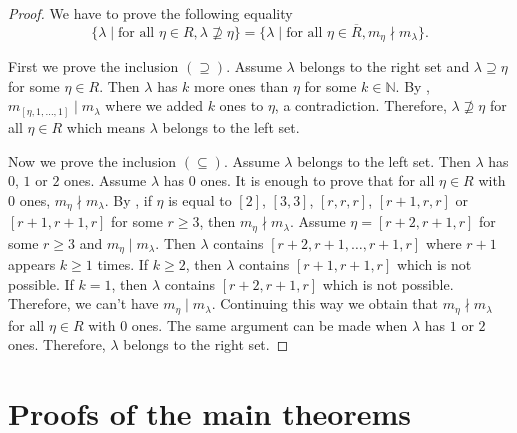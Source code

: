 \documentclass[a4paper, 12pt, reqno]{amsart}
\theoremstyle{remark}
\begin{document}
\begin{proof}
  We have to prove the following equality
  \begin{equation*}
    \{\lambda \mid \text{for all }\eta \in R, \lambda \nsupseteq \eta\} = \{\lambda \mid \text{for all } \eta \in \overline{R}, m_\eta \nmid m_\lambda\}.
  \end{equation*}
  
  First we prove the inclusion $(\supseteq)$.
  Assume $\lambda$ belongs to the right set and $\lambda \supseteq \eta$ for some $\eta \in R$.
  Then $\lambda$ has $k$ more ones than $\eta$ for some $k \in \mathbb{N}$.
  By , $m_{[\eta, 1, \dots, 1]} \mid m_\lambda$ where we added $k$ ones to $\eta$, a contradiction.
  Therefore, $\lambda \nsupseteq \eta$ for all $\eta \in R$ which means $\lambda$ belongs to the left set.

  Now we prove the inclusion $(\subseteq)$.
  Assume $\lambda$ belongs to the left set.
  Then $\lambda$ has $0$, $1$ or $2$ ones.
  Assume $\lambda$ has $0$ ones.
  It is enough to prove that for all $\eta \in R$ with $0$ ones, $m_\eta \nmid m_\lambda$.
  By , if $\eta$ is equal to $[2]$, $[3, 3]$, $[r, r, r]$, $[r + 1, r, r]$ or $[r + 1, r + 1, r]$ for some $r \ge 3$, then $m_\eta \nmid m_\lambda$.
  Assume $\eta = [r + 2, r + 1, r]$ for some $r \ge 3$ and $m_\eta \mid m_\lambda$.
  Then $\lambda$ contains $[r + 2, r + 1, \dots, r + 1, r]$ where $r + 1$ appears $k \ge 1$ times.
  If $k \ge 2$, then $\lambda$ contains $[r + 1, r + 1, r]$ which is not possible.
  If $k = 1$, then $\lambda$ contains $[r + 2, r + 1, r]$ which is not possible.
  Therefore, we can't have $m_\eta \mid m_\lambda$.
  Continuing this way we obtain that $m_\eta \nmid m_\lambda$ for all $\eta \in R$ with $0$ ones.
  The same argument can be made when $\lambda$ has $1$ or $2$ ones.
  Therefore, $\lambda$ belongs to the right set.
\end{proof}

\section{Proofs of the main theorems}
\label{sec:proofs-main-theorems}
\end{document}
